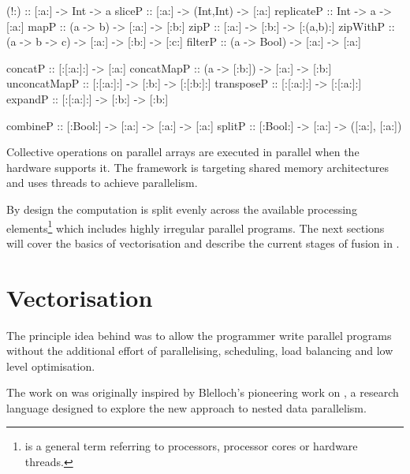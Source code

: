 \documentclass[preamble.tex]{subfiles}
\begin{document}
\begin{hscode2}[%
	caption={Type signatures for parallel array operations.},%
	label=lst:DPH-interface%
]
(!:)         :: [:a:] -> Int -> a
sliceP       :: [:a:] -> (Int,Int) -> [:a:]
replicateP   :: Int -> a -> [:a:]
mapP         :: (a -> b) -> [:a:] -> [:b:]
zipP         :: [:a:] -> [:b:] -> [:(a,b):]
zipWithP     :: (a -> b -> c) -> [:a:] -> [:b:] -> [:c:]
filterP      :: (a -> Bool) -> [:a:] -> [:a:]

concatP      :: [:[:a:]:] -> [:a:]
concatMapP   :: (a -> [:b:]) -> [:a:] -> [:b:]
unconcatMapP :: [:[:a:]:] -> [:b:] -> [:[:b:]:]
transposeP   :: [:[:a:]:] -> [:[:a:]:]
expandP      :: [:[:a:]:] -> [:b:] -> [:b:]

combineP     :: [:Bool:] -> [:a:] -> [:a:] -> [:a:]
splitP       :: [:Bool:] -> [:a:] -> ([:a:], [:a:])
\end{hscode2}



Collective operations on parallel arrays are executed in parallel when the hardware supports it. The framework is targeting shared memory architectures and uses \Haskell threads \cite{Jones08atutorial} to achieve parallelism.

By design the computation is split evenly across the available processing elements\footnote{ is a general term referring to processors, processor cores or hardware threads.} which includes highly irregular parallel programs. The next sections will  cover the basics of vectorisation and describe the current stages of fusion in \DPH.



\clearpage

\section{Vectorisation}
\label{sec:Vectorisation}
\ivect

The principle idea behind \DPH was to allow the programmer write parallel programs without the additional effort of parallelising, scheduling, load balancing and low level optimisation.

The work on \DPH was originally inspired by Blelloch's pioneering work on  \cite{BCH+}, a research language designed to explore the new approach to nested data parallelism.\indp
\end{document}
